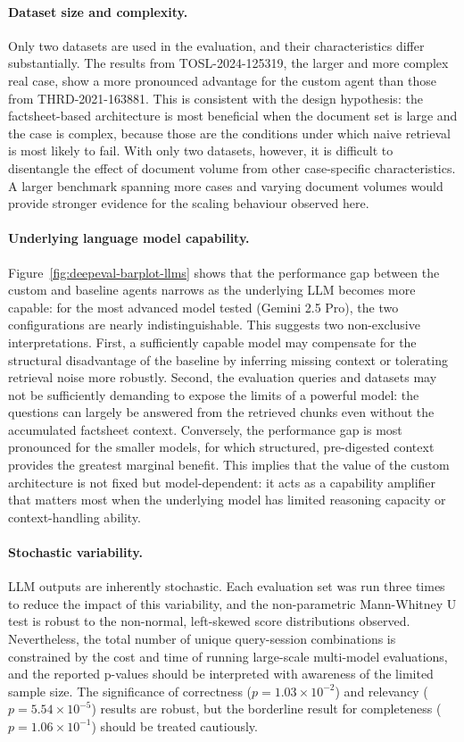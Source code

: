 \paragraph{Dataset size and complexity.}
Only two datasets are used in the evaluation, and their characteristics differ substantially. The results from TOSL-2024-125319, the larger and more complex real case, show a more pronounced advantage for the custom agent than those from THRD-2021-163881. This is consistent with the design hypothesis: the factsheet-based architecture is most beneficial when the document set is large and the case is complex, because those are the conditions under which naive retrieval is most likely to fail. With only two datasets, however, it is difficult to disentangle the effect of document volume from other case-specific characteristics. A larger benchmark spanning more cases and varying document volumes would provide stronger evidence for the scaling behaviour observed here.

\paragraph{Underlying language model capability.}
Figure~\ref{fig:deepeval-barplot-llms} shows that the performance gap between the custom and baseline agents narrows as the underlying LLM becomes more capable: for the most advanced model tested (Gemini 2.5 Pro), the two configurations are nearly indistinguishable. This suggests two non-exclusive interpretations. First, a sufficiently capable model may compensate for the structural disadvantage of the baseline by inferring missing context or tolerating retrieval noise more robustly. Second, the evaluation queries and datasets may not be sufficiently demanding to expose the limits of a powerful model: the questions can largely be answered from the retrieved chunks even without the accumulated factsheet context. Conversely, the performance gap is most pronounced for the smaller models, for which structured, pre-digested context provides the greatest marginal benefit. This implies that the value of the custom architecture is not fixed but model-dependent: it acts as a capability amplifier that matters most when the underlying model has limited reasoning capacity or context-handling ability.

\paragraph{Stochastic variability.}
LLM outputs are inherently stochastic. Each evaluation set was run three times to reduce the impact of this variability, and the non-parametric Mann-Whitney U test is robust to the non-normal, left-skewed score distributions observed. Nevertheless, the total number of unique query-session combinations is constrained by the cost and time of running large-scale multi-model evaluations, and the reported p-values should be interpreted with awareness of the limited sample size. The significance of correctness ($p = 1.03 \times 10^{-2}$) and relevancy ($p = 5.54 \times 10^{-5}$) results are robust, but the borderline result for completeness ($p = 1.06 \times 10^{-1}$) should be treated cautiously.

